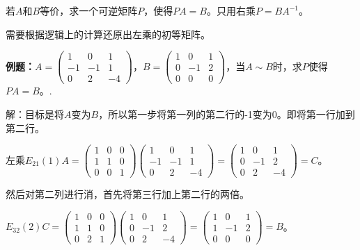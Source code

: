 \documentclass[UTF8, 12pt]{ctexart}
\begin{document}
若$A$和$B$等价，求一个可逆矩阵$P$，使得$PA=B$。只用右乘$P=BA^{-1}$。

需要根据逻辑上的计算还原出左乘的初等矩阵。\medskip

\textbf{例题：}$A=\left(\begin{array}{ccc}
    1 & 0 & 1 \\
    -1 & -1 & 1 \\
    0 & 2 & -4
\end{array}\right)$，$B=\left(\begin{array}{ccc}
    1 & 0 & 1 \\
    0 & -1 & 2 \\
    0 & 0 & 0
\end{array}\right)$，当$A\sim B$时，求$P$使得$PA=B$。.

解：目标是将$A$变为$B$，所以第一步将第一列的第二行的-1变为0。即将第一行加到第二行。

左乘$E_{21}(1)A=\left(\begin{array}{ccc}
    1 & 0 & 0 \\
    1 & 1 & 0 \\
    0 & 0 & 1
\end{array}\right)\left(\begin{array}{ccc}
    1 & 0 & 1 \\
    -1 & -1 & 1 \\
    0 & 2 & -4
\end{array}\right)=\left(\begin{array}{ccc}
    1 & 0 & 1 \\
    0 & -1 & 2 \\
    0 & 2 & -4
\end{array}\right)=C$。\medskip

然后对第二列进行消，首先将第三行加上第二行的两倍。

$E_{32}(2)C=\left(\begin{array}{ccc}
    1 & 0 & 0 \\
    1 & 1 & 0 \\
    0 & 2 & 1
\end{array}\right)\left(\begin{array}{ccc}
    1 & 0 & 1 \\
    0 & -1 & 2 \\
    0 & 2 & -4
\end{array}\right)=\left(\begin{array}{ccc}
    1 & 0 & 1 \\
    1 & -1 & 2 \\
    0 & 0 & 0
\end{array}\right)=B$。\medskip
\end{document}
